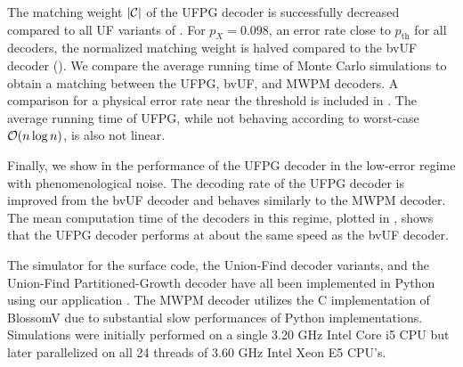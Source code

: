 The matching weight $\lvert\mathcal{C}\rvert$ of the UFPG decoder is successfully decreased compared to all UF variants of . For $p_X = 0.098$, an error rate close to $p_{\text{th}}$ for all decoders, the normalized matching weight is halved compared to the bvUF decoder (). We compare the average running time of Monte Carlo simulations to obtain a matching between the UFPG, bvUF, and MWPM decoders. A comparison for a physical error rate near the threshold is included in . The average running time of UFPG, while not behaving according to worst-case $\mathcal{O}(n \log{n})$, is also not linear. 

Finally, we show in  the performance of the UFPG decoder in the low-error regime with phenomenological noise. The decoding rate of the UFPG decoder is improved from the bvUF decoder and behaves similarly to the MWPM decoder. The mean computation time of the decoders in this regime, plotted in , shows that the UFPG decoder performs at about the same speed as the bvUF decoder.\par

The simulator for the surface code, the Union-Find decoder variants, and the Union-Find Partitioned-Growth decoder have all been implemented in Python using our application \cite{qsurface}. The MWPM decoder utilizes the C implementation of BlossomV \cite{kolmogorov2009blossom} due to substantial slow performances of Python implementations. Simulations were initially performed on a single 3.20 GHz Intel Core i5 CPU but later parallelized on all 24 threads of 3.60 GHz Intel Xeon E5 CPU's. 